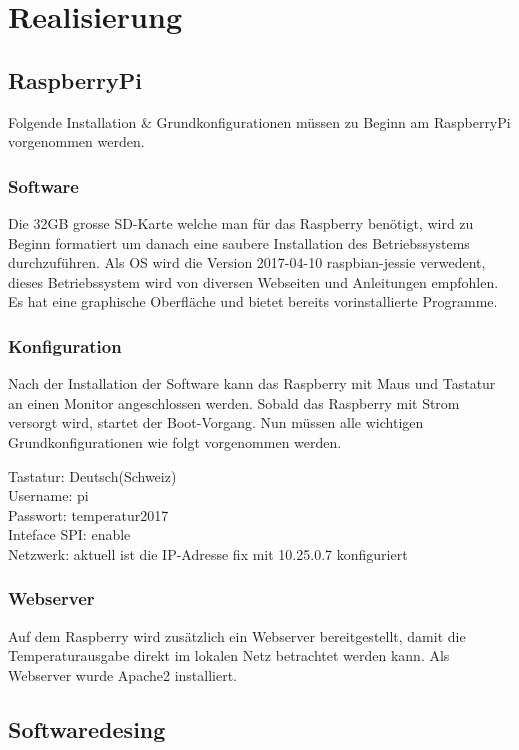 \section{Realisierung}

\subsection{RaspberryPi}

Folgende Installation \& Grundkonfigurationen müssen zu Beginn am RaspberryPi vorgenommen werden.

\subsubsection{Software}
Die 32GB grosse SD-Karte welche man für das Raspberry benötigt, wird zu Beginn formatiert um danach eine saubere Installation des Betriebssystems durchzuführen. Als OS wird die Version 2017-04-10 raspbian-jessie verwedent, dieses Betriebssystem wird von diversen Webseiten und Anleitungen empfohlen. Es hat eine graphische Oberfläche und bietet bereits vorinstallierte Programme.

\subsubsection{Konfiguration}
Nach der Installation der Software kann das Raspberry mit Maus und Tastatur an einen Monitor angeschlossen werden. Sobald das Raspberry mit Strom versorgt wird, startet der Boot-Vorgang.
Nun müssen alle wichtigen Grundkonfigurationen wie folgt vorgenommen werden.

Tastatur: Deutsch(Schweiz)\\
Username: pi\\
Passwort: temperatur2017\\
Inteface SPI: enable\\
Netzwerk: aktuell ist die IP-Adresse fix mit 10.25.0.7 konfiguriert

\subsubsection{Webserver}
Auf dem Raspberry wird zusätzlich ein Webserver bereitgestellt, damit die Temperaturausgabe direkt im lokalen Netz betrachtet werden kann. Als Webserver wurde Apache2 installiert.


\subsection{Softwaredesing}

